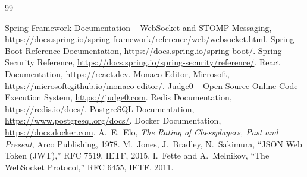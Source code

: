 \documentclass[12pt,a4paper,oneside]{report}
\begin{document}
\begin{thebibliography}{99}
 Spring Framework Documentation -- WebSocket and STOMP Messaging, \url{https://docs.spring.io/spring-framework/reference/web/websocket.html}.
 Spring Boot Reference Documentation, \url{https://docs.spring.io/spring-boot/}.
 Spring Security Reference, \url{https://docs.spring.io/spring-security/reference/}.
 React Documentation, \url{https://react.dev}.
 Monaco Editor, Microsoft, \url{https://microsoft.github.io/monaco-editor/}.
 Judge0 -- Open Source Online Code Execution System, \url{https://judge0.com}.
 Redis Documentation, \url{https://redis.io/docs/}.
 PostgreSQL Documentation, \url{https://www.postgresql.org/docs/}.
 Docker Documentation, \url{https://docs.docker.com}.
 A.~E.~Elo, \emph{The Rating of Chessplayers, Past and Present}, Arco Publishing, 1978.
 M.~Jones, J.~Bradley, N.~Sakimura, ``JSON Web Token (JWT),'' RFC 7519, IETF, 2015.
 I.~Fette and A.~Melnikov, ``The WebSocket Protocol,'' RFC 6455, IETF, 2011.
\end{thebibliography}
\end{document}
